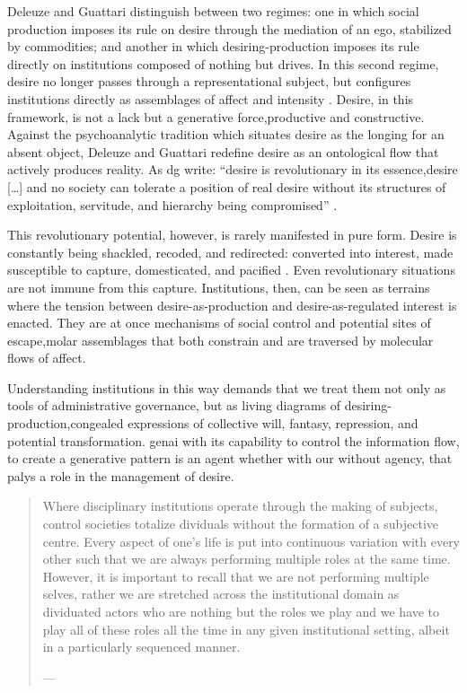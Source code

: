 Deleuze and Guattari distinguish between two regimes: one in which social production imposes its rule on desire through the mediation of an ego, stabilized by commodities; and another in which desiring-production imposes its rule directly on institutions composed of nothing but drives. In this second regime, desire no longer passes through a representational subject, but configures institutions directly as assemblages of affect and intensity \parencite[63]{deleuze1983}. Desire, in this framework, is not a lack but a generative force,productive and constructive. Against the psychoanalytic tradition which situates desire as the longing for an absent object, Deleuze and Guattari redefine desire as an ontological flow that actively produces reality. As \gls{dg} write: ``desire is revolutionary in its essence,desire [\ldots] and no society can tolerate a position of real desire without its structures of exploitation, servitude, and hierarchy being compromised'' \parencite[116]{deleuze1983}.

This revolutionary potential, however, is rarely manifested in pure form. Desire is constantly being shackled, recoded, and redirected: converted into interest, made susceptible to capture, domesticated, and pacified \parencite[11]{buchanan2008b}. Even revolutionary situations are not immune from this capture. Institutions, then, can be seen as terrains where the tension between desire-as-production and desire-as-regulated interest is enacted. They are at once mechanisms of social control and potential sites of escape,molar assemblages that both constrain and are traversed by molecular flows of affect.

Understanding institutions in this way demands that we treat them not only as tools of administrative governance, but as living diagrams of desiring-production,congealed expressions of collective will, fantasy, repression, and potential transformation. \Gls{genai} with its capability to control the information flow, to create a generative pattern is an agent whether with our without agency, that palys a role in the management of desire.


\begin{quote}
	Where disciplinary institutions operate through the making of subjects,  control societies totalize dividuals without the formation of a subjective centre.  Every aspect of one’s life is put into continuous variation with every other such  that we are always performing multiple roles at the same time. However, it is  important to recall that we are not performing multiple selves, rather we are  stretched across the institutional domain as dividuated actors who are nothing  but the roles we play and we have to play all of these roles all the time in any given  institutional setting, albeit in a particularly sequenced manner.

	— \cite[14]{mackenzie2021}
\end{quote}



